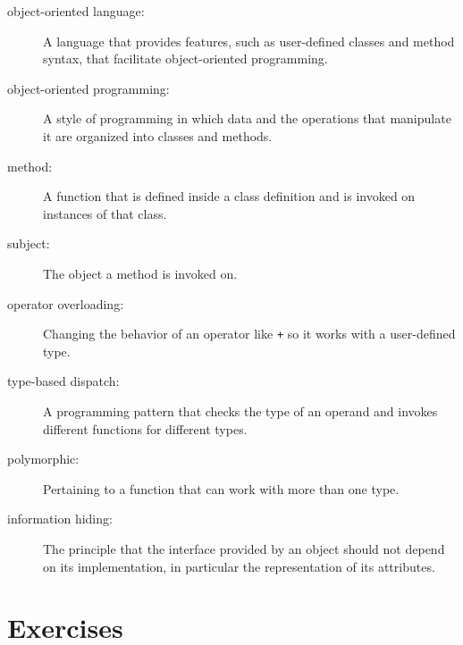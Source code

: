 \documentclass[10pt]{book}
\begin{document}
\begin{description}

\item[object-oriented language:] A language that provides features,
  such as user-defined classes and method syntax, that facilitate
  object-oriented programming.

\item[object-oriented programming:] A style of programming in which
data and the operations that manipulate it are organized into classes
and methods.

\item[method:] A function that is defined inside a class definition and
is invoked on instances of that class.

\item[subject:] The object a method is invoked on.

\item[operator overloading:] Changing the behavior of an operator like
{\tt +} so it works with a user-defined type.

\item[type-based dispatch:] A programming pattern that checks the type
of an operand and invokes different functions for different types.

\item[polymorphic:] Pertaining to a function that can work with more
  than one type.

\item[information hiding:] The principle that the interface provided
by an object should not depend on its implementation, in particular
the representation of its attributes.


\end{description}

\section{Exercises}
\end{document}
